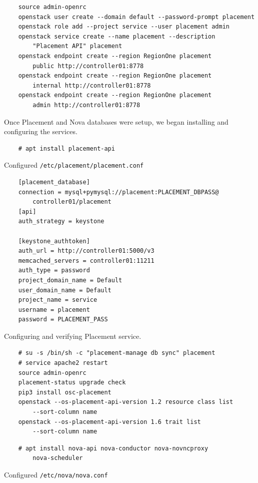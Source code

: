 \documentclass{article}
\begin{document}
\begin{verbatim}
    source admin-openrc
    openstack user create --domain default --password-prompt placement
    openstack role add --project service --user placement admin
    openstack service create --name placement --description 
        "Placement API" placement
    openstack endpoint create --region RegionOne placement 
        public http://controller01:8778
    openstack endpoint create --region RegionOne placement 
        internal http://controller01:8778
    openstack endpoint create --region RegionOne placement 
        admin http://controller01:8778
\end{verbatim}

Once Placement and Nova databases were setup, we began installing and configuring the services.

\begin{verbatim}
    # apt install placement-api
\end{verbatim}

Configured \texttt{/etc/placement/placement.conf}

\begin{verbatim}
    [placement_database]
    connection = mysql+pymysql://placement:PLACEMENT_DBPASS@
        controller01/placement
    [api]
    auth_strategy = keystone

    [keystone_authtoken]
    auth_url = http://controller01:5000/v3
    memcached_servers = controller01:11211
    auth_type = password
    project_domain_name = Default
    user_domain_name = Default
    project_name = service
    username = placement
    password = PLACEMENT_PASS
\end{verbatim}

Configuring and verifying Placement service.

\begin{verbatim}
    # su -s /bin/sh -c "placement-manage db sync" placement
    # service apache2 restart
    source admin-openrc
    placement-status upgrade check
    pip3 install osc-placement
    openstack --os-placement-api-version 1.2 resource class list 
        --sort-column name
    openstack --os-placement-api-version 1.6 trait list 
        --sort-column name
\end{verbatim}

\begin{verbatim}
    # apt install nova-api nova-conductor nova-novncproxy 
        nova-scheduler
\end{verbatim}
Configured \texttt{/etc/nova/nova.conf}
\end{document}
